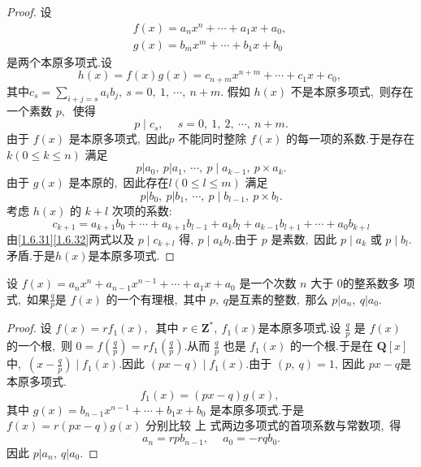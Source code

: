 \begin{proof}
	设
	$$\begin{array}{l}
		f(x)=a_{n} x^{n}+\cdots+a_{1} x+a_{0},\  \\
		g(x)=b_{m} x^{m}+\cdots+b_{1} x+b_{0}
	\end{array}$$
	是两个本原多项式.设
	$$h(x)=f(x) g(x)=c_{n+m} x^{n+m}+\cdots+c_{1} x+c_{0},\ $$
	其中$  c_{s}=\sum_{i+j=s} a_{i} b_{j},\  s=0,\ 1,\  \cdots,\  n+m  .$
	假如  $h(x) $ 不是本原多项式,\  则存在一个素数  $p ,\ $ 使得
	$$p \mid c_{s},\  \quad s=0,\ 1,\ 2,\  \cdots,\  n+m .$$
	由于 $ f(x)$  是本原多项式,\  因此$  p$  不能同时整除 $ f(x)$  的每一项的系数.于是存在  $k(0 \leqslant k \leqslant n) $ 满足
	\begin{equation}
		p\left|a_{0},\  p\right| a_{1},\  \cdots,\  p \mid a_{k-1},\  p \times a_{k} .\label{1.6.31}
	\end{equation}
	由于 $ g(x) $ 是本原的,\  因此存在$  l(0 \leqslant l \leqslant m)$  满足
	\begin{equation}
		p\left|b_{0},\  p\right| b_{1},\  \cdots,\  p \mid b_{l-1},\  p \times b_{l} .\label{1.6.32}
	\end{equation}
	考虑  $h(x) $ 的 $ k+l $ 次项的系数:
	$$c_{k+1}=a_{k+1} b_{0}+\cdots+a_{k+1} b_{l-1}+a_{k} b_{l}+a_{k-1} b_{l+1}+\cdots+a_{0} b_{k+l}$$
	由\eqref{1.6.31}\eqref{1.6.32}两式以及  $p \mid c_{k+l}$  得$,\   p \mid a_{k} b_{l}  .$由于  $p$  是素数,\  因此 $ p \mid a_{k} $ 或 $ p \mid b_{l}  .$矛盾.于是$  h(x)  $是本原多项式.
\end{proof}
\newpage
\begin{theorem}
	设 $ f(x)=a_{n} x^{n}+a_{n-1} x^{n-1}+\cdots+a_{1} x+a_{0} $ 是一个次数  $n $ 大于 $0 $的整系数多 项式,\  如果$  \frac{q}{p}  $是 $ f(x)$  的一个有理根,\  其中 $ p,\  q  $是互素的整数,\  那么 $ p\left|a_{n},\  q\right| a_{0}  .$
\end{theorem}
\begin{proof}
	设  $f(x)=r f_{1}(x) ,\ $ 其中 $ r \in \mathbf{Z}^{*},\  f_{1}(x)  $是本原多项式.设 $ \frac{q}{p} $ 是  $f(x)$  的一个根,\  则 $ 0=f\left(\frac{q}{p}\right)=r f_{1}\left(\frac{q}{p}\right)  .$从而 $ \frac{q}{p} $ 也是  $f_{1}(x) $ 的一个根.于是在 $ \mathbf{Q}[x] $ 中,\   $\left(x-\frac{q}{p}\right) \mid f_{1}(x)  .$因此 $ (p x-q) \mid f_{1}(x)  .$由于 $ (p,\  q)=1 ,\  $因此 $ p x-q  $是本原多项式.
	$$f_{1}(x)=(p x-q) g(x),\ $$
	其中 $ g(x)=b_{n-1} x^{n-1}+\cdots+b_{1} x+b_{0}$  是本原多项式.于是
	$f(x)=r(p x-q) g(x)$
	分别比较 上 式两边多项式的首项系数与常数项,\  得
	$$a_{n}=r p b_{n-1},\  \quad a_{0}=-r q b_{0} .$$
	因此 $ p\left|a_{n},\  q\right| a_{0} .$
\end{proof}
